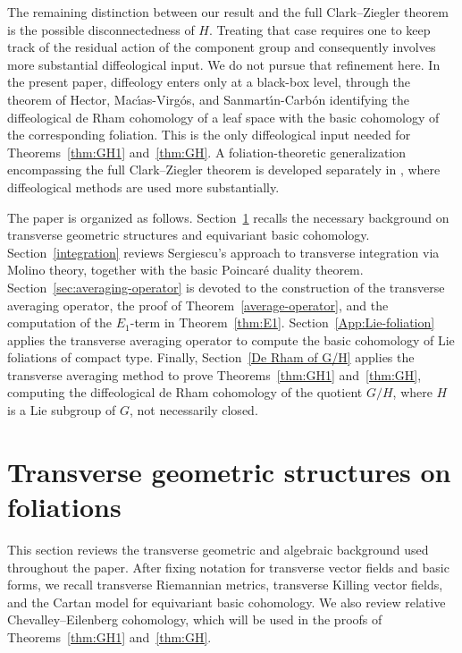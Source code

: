 \documentclass[reqno, 11pt]{amsart}
\theoremstyle{definition}
\theoremstyle{property}
\theoremstyle{remark}
\numberwithin{equation}{section}
\begin{document}
The remaining distinction between our result and the full Clark--Ziegler
theorem is the possible disconnectedness of $H$. Treating
that case requires one to keep track of the residual action of the component
group and consequently involves more substantial diffeological input. We do
not pursue that refinement here. In the present paper, diffeology enters only
at a black-box level, through the theorem of Hector,
Mac\'{\i}as-Virg\'os, and Sanmart\'{\i}n-Carb\'on identifying the
diffeological de Rham cohomology of a leaf space with the basic cohomology of
the corresponding foliation. This is the only diffeological input needed for
Theorems~\ref{thm:GH1} and~\ref{thm:GH}. A foliation-theoretic generalization
encompassing the full Clark--Ziegler theorem is developed separately in
\cite{L26}, where diffeological methods are used more substantially.

The paper is organized as follows. Section~\ref{sec:background} recalls the
necessary background on transverse geometric structures and equivariant basic
cohomology. Section~\ref{integration} reviews Sergiescu's approach to
transverse integration via Molino theory, together with the basic
Poincar\'e duality theorem. Section~\ref{sec:averaging-operator} is devoted to
the construction of the transverse averaging operator, the proof of
Theorem~\ref{average-operator}, and the computation of the $E_1$-term in
Theorem~\ref{thm:E1}. Section~\ref{App:Lie-foliation} applies the transverse
averaging operator to compute the basic cohomology of Lie foliations of
compact type. Finally, Section~\ref{De Rham of G/H} applies the transverse
averaging method to prove Theorems~\ref{thm:GH1} and~\ref{thm:GH}, computing
the diffeological de Rham cohomology of the quotient $G/H$, where $H$ is a
Lie subgroup of $G$, not necessarily closed.



\section{Transverse geometric structures on foliations}\label{sec:background}

This section reviews the transverse geometric and algebraic background used
throughout the paper. After fixing notation for transverse vector fields and
basic forms, we recall transverse Riemannian metrics, transverse Killing vector
fields, and the Cartan model for equivariant basic cohomology. We also review
relative Chevalley--Eilenberg cohomology, which will be used in the proofs of
Theorems~\ref{thm:GH1} and~\ref{thm:GH}.
\end{document}
